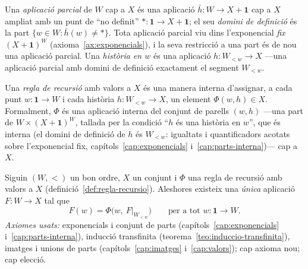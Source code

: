 \begin{definicio}\label{def:historia}
Una \emph{aplicació parcial} de \(W\) cap a \(X\) és una aplicació
\(\bar h\colon W\to X+\mathbf1\) cap a \(X\) ampliat amb un punt de
\enquote{no definit} \(\ast\colon\mathbf1\to X+\mathbf1\); el seu
\emph{domini de definició} és la part \(\{w\in W: \bar h(w)\neq\ast\}\). Tota
aplicació parcial viu dins l'exponencial \emph{fix} \((X+\mathbf1)^{W}\)
(axioma~\ref{ax:exponencials}), i la seva restricció a una part és de nou una
aplicació parcial. Una \emph{història en \(w\)} és una aplicació
\(h\colon W_{<w}\to X\) ---una aplicació parcial amb domini de definició
exactament el segment \(W_{<w}\).
\end{definicio}

\begin{definicio}\label{def:regla-recursio}
Una \emph{regla de recursió} amb valors a \(X\) és una manera interna
d'assignar, a cada punt \(w\colon\mathbf1\to W\) i cada història
\(h\colon W_{<w}\to X\), un element \(\Phi(w,h)\in X\). Formalment, \(\Phi\)
és una aplicació interna del conjunt de parells \((w,h)\) ---una part de
\(W\times(X+\mathbf1)^{W}\), tallada per la condició \enquote{\(h\) és una
història en \(w\)}, que és interna (el domini de definició de \(h\) és
\(W_{<w}\): igualtats i quantificadors acotats sobre l'exponencial fix,
capítols~\ref{cap:exponencials} i~\ref{cap:parts-interna})--- cap a \(X\).
\end{definicio}

\begin{teorema}\label{teo:recursio-transfinita}
Siguin \((W,<)\) un bon ordre, \(X\) un conjunt i \(\Phi\) una regla de
recursió amb valors a \(X\) (definició~\ref{def:regla-recursio}). Aleshores
existeix una \emph{única} aplicació \(F\colon W\to X\) tal que
\[
F(w)=\Phi\bigl(w,\ F|_{W_{<w}}\bigr)
\qquad\text{per a tot } w\colon\mathbf1\to W .
\]
\emph{Axiomes usats:} exponencials i conjunt de parts
(capítols~\ref{cap:exponencials} i~\ref{cap:parts-interna}), inducció
transfinita (teorema~\ref{teo:induccio-transfinita}), imatges i unions de
parts (capítols~\ref{cap:imatges} i~\ref{cap:valors}); cap axioma nou; cap
elecció.
\end{teorema}

